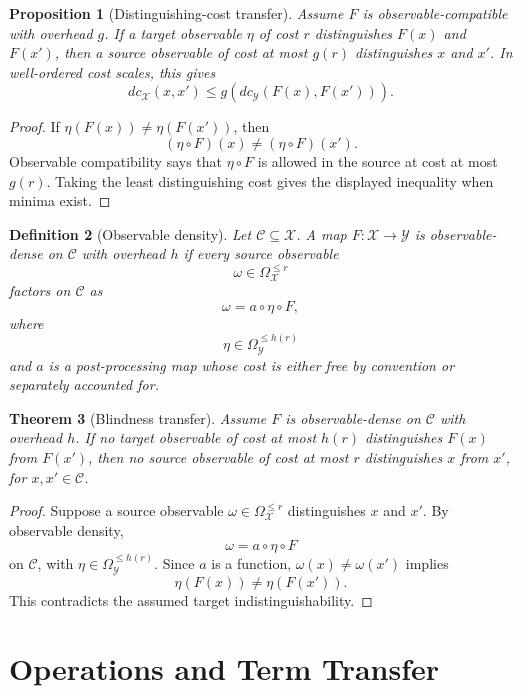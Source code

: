 \documentclass[11pt]{article}
\newtheorem{theorem}{Theorem}[section]
\newtheorem{proposition}[theorem]{Proposition}
\newtheorem{definition}[theorem]{Definition}
\begin{document}
\begin{proposition}[Distinguishing-cost transfer]
Assume \(F\) is observable-compatible with overhead \(g\). If a target observable \(\eta\) of cost \(r\) distinguishes \(F(x)\) and \(F(x')\), then a source observable of cost at most \(g(r)\) distinguishes \(x\) and \(x'\). In well-ordered cost scales, this gives
\[
dc_{\mathcal X}(x,x')
\leq
g(dc_{\mathcal Y}(F(x),F(x'))).
\]
\end{proposition}

\begin{proof}
If \(\eta(F(x))\ne\eta(F(x'))\), then
\[
(\eta\circ F)(x)\ne(\eta\circ F)(x').
\]
Observable compatibility says that \(\eta\circ F\) is allowed in the source at cost at most \(g(r)\). Taking the least distinguishing cost gives the displayed inequality when minima exist.
\end{proof}

\begin{definition}[Observable density]
Let \(\mathcal C\subseteq\mathcal X\). A map \(F:\mathcal X\to\mathcal Y\) is observable-dense on \(\mathcal C\) with overhead \(h\) if every source observable
\[
\omega\in\Omega_\mathcal X^{\leq r}
\]
factors on \(\mathcal C\) as
\[
\omega=a\circ\eta\circ F,
\]
where
\[
\eta\in\Omega_\mathcal Y^{\leq h(r)}
\]
and \(a\) is a post-processing map whose cost is either free by convention or separately accounted for.
\end{definition}

\begin{theorem}[Blindness transfer]
Assume \(F\) is observable-dense on \(\mathcal C\) with overhead \(h\). If no target observable of cost at most \(h(r)\) distinguishes \(F(x)\) from \(F(x')\), then no source observable of cost at most \(r\) distinguishes \(x\) from \(x'\), for \(x,x'\in\mathcal C\).
\end{theorem}

\begin{proof}
Suppose a source observable \(\omega\in\Omega_\mathcal X^{\leq r}\) distinguishes \(x\) and \(x'\). By observable density,
\[
\omega=a\circ\eta\circ F
\]
on \(\mathcal C\), with \(\eta\in\Omega_\mathcal Y^{\leq h(r)}\). Since \(a\) is a function, \(\omega(x)\ne\omega(x')\) implies
\[
\eta(F(x))\ne\eta(F(x')).
\]
This contradicts the assumed target indistinguishability.
\end{proof}

\section{Operations and Term Transfer}
\end{document}
